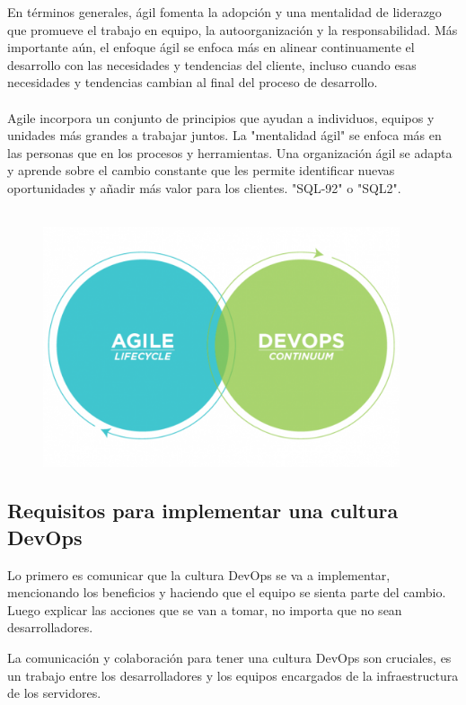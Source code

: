 \documentclass[preprint,12pt]{elsarticle}
\begin{document}
En términos generales, ágil fomenta la adopción y una mentalidad de liderazgo que promueve el trabajo en equipo, la autoorganización y la responsabilidad. Más importante aún, el enfoque ágil se enfoca más en alinear continuamente el desarrollo con las necesidades y tendencias del cliente, incluso cuando esas necesidades y tendencias cambian al final del proceso de desarrollo.
\\
\\
Agile incorpora un conjunto de principios que ayudan a individuos, equipos y unidades más grandes a trabajar juntos. La "mentalidad ágil" se enfoca más en las personas que en los procesos y herramientas. Una organización ágil se adapta y aprende sobre el cambio constante que les permite identificar nuevas oportunidades y añadir más valor para los clientes. "SQL-92" o "SQL2".\cite{DWarehouse02}
\\
\\

\begin{figure}[htb]
				\begin{center}
					\includegraphics[width=10.5cm]{./IMAGENES/evolucion}
				\end{center}
			\end{figure}


\subsection{Requisitos para implementar una cultura DevOps}
Lo primero es comunicar que la cultura DevOps se va a implementar, mencionando los beneficios y haciendo que el equipo se sienta parte del cambio. Luego explicar las acciones que se van a tomar, no importa que no sean desarrolladores.

La comunicación y colaboración para tener una cultura DevOps son cruciales, es un trabajo entre los desarrolladores y los equipos encargados de la infraestructura de los servidores.
\end{document}
